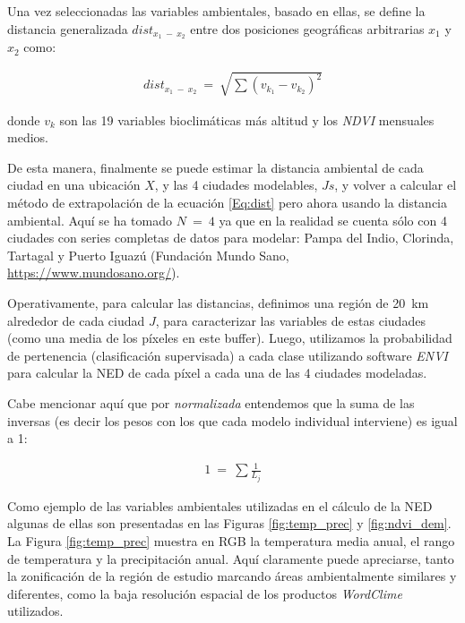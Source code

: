   \par Una vez seleccionadas las variables ambientales, basado en ellas, se
    define la distancia generalizada $dist_{x_{1}\ -\ x_{2}}$ entre dos
    posiciones geográficas arbitrarias $x_{1}$ y $x_{2}$ como:

    \begin{align}
      dist_{x_{1}\ -\ x_{2}} \ =\ \sqrt{\sum{}{(v_{k_{1}} - v_{k_{2}})^{2}}}
    \end{align}

    donde $v_{k}$ son las 19 variables bioclimáticas más altitud y los
    \textit{NDVI} mensuales medios.

  \par De esta manera, finalmente se puede estimar la distancia ambiental de
    cada ciudad en una ubicación $X$, y las 4 ciudades modelables,
    $Js$, y volver a calcular el método de extrapolación de la ecuación \ref{Eq:dist}
    pero ahora usando la distancia ambiental. Aquí se ha tomado $N\ =\ 4$ ya
    que en la realidad se cuenta sólo con 4 ciudades con series completas de datos
    para modelar: Pampa del Indio, Clorinda, Tartagal y Puerto Iguazú
    (Fundación Mundo Sano, \url{https://www.mundosano.org/}).



  \par Operativamente, para calcular las distancias, definimos una región de
    \SI{20}{\kilo\meter} alrededor de cada ciudad $J$, para caracterizar las
    variables de estas ciudades (como una media de los píxeles en este buffer).
    Luego, utilizamos la probabilidad de pertenencia (clasificación supervisada)
    a cada clase utilizando software \textit{ENVI} para calcular la NED de cada píxel
    a cada una de las 4 ciudades modeladas.

  \par Cabe mencionar aquí que por \textit{normalizada} entendemos que la
    suma de las inversas (es decir los pesos con los que cada modelo
    individual interviene) es igual a 1:

  \begin{align}
    1\ =\ \sum{}{\frac{1}{L_{j}}}
  \end{align}


  \par Como ejemplo de las variables ambientales utilizadas en el cálculo de
    la NED algunas de ellas son presentadas en las Figuras \ref{fig:temp_prec}
    y \ref{fig:ndvi_dem}.
    La Figura \ref{fig:temp_prec} muestra en RGB la temperatura media anual,
    el rango de temperatura y la precipitación anual. Aquí claramente puede
    apreciarse, tanto la zonificación de la región de estudio marcando áreas
    ambientalmente similares y diferentes, como la baja resolución espacial
    de los productos \textit{WordClime} utilizados.

